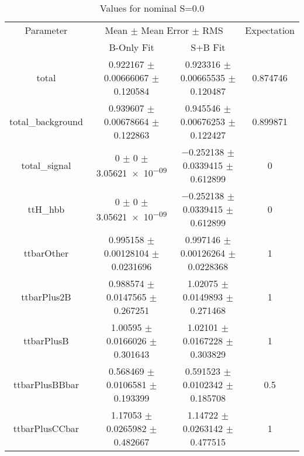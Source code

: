 \begin{table}
\centering
\caption{Values for nominal S=0.0}
\begin{tabular}{cccc}
\toprule
Parameter & \multicolumn{2}{c}{Mean $\pm$ Mean Error $\pm$ RMS} & Expectation\\
 & B-Only Fit & S+B Fit & \\
\midrule
total & \num{0.922167} $\pm$ \num{0.00666067} $\pm$ \num{0.120584} & \num{0.923316} $\pm$ \num{0.00665535} $\pm$ \num{0.120487} & \num{0.874746}\\
total\_background & \num{0.939607} $\pm$ \num{0.00678664} $\pm$ \num{0.122863} & \num{0.945546} $\pm$ \num{0.00676253} $\pm$ \num{0.122427} & \num{0.899871}\\
total\_signal & \num{0} $\pm$ \num{0} $\pm$ \num{3.05621e-09} & \num{-0.252138} $\pm$ \num{0.0339415} $\pm$ \num{0.612899} & \num{0}\\
ttH\_hbb & \num{0} $\pm$ \num{0} $\pm$ \num{3.05621e-09} & \num{-0.252138} $\pm$ \num{0.0339415} $\pm$ \num{0.612899} & \num{0}\\
ttbarOther & \num{0.995158} $\pm$ \num{0.00128104} $\pm$ \num{0.0231696} & \num{0.997146} $\pm$ \num{0.00126264} $\pm$ \num{0.0228368} & \num{1}\\
ttbarPlus2B & \num{0.988574} $\pm$ \num{0.0147565} $\pm$ \num{0.267251} & \num{1.02075} $\pm$ \num{0.0149893} $\pm$ \num{0.271468} & \num{1}\\
ttbarPlusB & \num{1.00595} $\pm$ \num{0.0166026} $\pm$ \num{0.301643} & \num{1.02101} $\pm$ \num{0.0167228} $\pm$ \num{0.303829} & \num{1}\\
ttbarPlusBBbar & \num{0.568469} $\pm$ \num{0.0106581} $\pm$ \num{0.193399} & \num{0.591523} $\pm$ \num{0.0102342} $\pm$ \num{0.185708} & \num{0.5}\\
ttbarPlusCCbar & \num{1.17053} $\pm$ \num{0.0265982} $\pm$ \num{0.482667} & \num{1.14722} $\pm$ \num{0.0263142} $\pm$ \num{0.477515} & \num{1}\\
\bottomrule
\end{tabular}
\end{table}